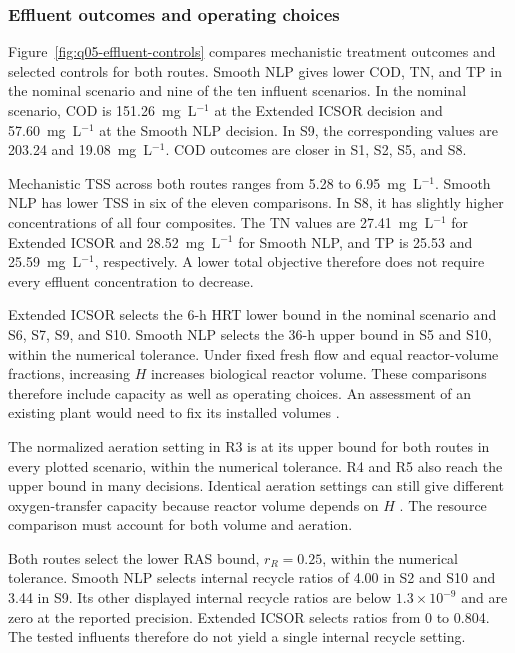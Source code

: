 \documentclass[a4paper,fleqn]{cas-sc}
\begin{document}
\subsubsection{Effluent outcomes and operating choices}
\label{sec:results-effluent-controls}

Figure~\ref{fig:q05-effluent-controls} compares mechanistic treatment outcomes and selected controls for both routes. Smooth NLP gives lower COD, TN, and TP in the nominal scenario and nine of the ten influent scenarios. In the nominal scenario, COD is 151.26~mg~L$^{-1}$ at the Extended ICSOR decision and 57.60~mg~L$^{-1}$ at the Smooth NLP decision. In S9, the corresponding values are 203.24 and 19.08~mg~L$^{-1}$. COD outcomes are closer in S1, S2, S5, and S8.

Mechanistic TSS across both routes ranges from 5.28 to 6.95~mg~L$^{-1}$. Smooth NLP has lower TSS in six of the eleven comparisons. In S8, it has slightly higher concentrations of all four composites. The TN values are 27.41~mg~L$^{-1}$ for Extended ICSOR and 28.52~mg~L$^{-1}$ for Smooth NLP, and TP is 25.53 and 25.59~mg~L$^{-1}$, respectively. A lower total objective therefore does not require every effluent concentration to decrease.

Extended ICSOR selects the 6-h HRT lower bound in the nominal scenario and S6, S7, S9, and S10. Smooth NLP selects the 36-h upper bound in S5 and S10, within the numerical tolerance. Under fixed fresh flow and equal reactor-volume fractions, increasing $H$ increases biological reactor volume. These comparisons therefore include capacity as well as operating choices. An assessment of an existing plant would need to fix its installed volumes \citep{Zhang2026}.

The normalized aeration setting in R3 is at its upper bound for both routes in every plotted scenario, within the numerical tolerance. R4 and R5 also reach the upper bound in many decisions. Identical aeration settings can still give different oxygen-transfer capacity because reactor volume depends on $H$ \citep{Miederer2025}. The resource comparison must account for both volume and aeration.

Both routes select the lower RAS bound, $r_R=0.25$, within the numerical tolerance. Smooth NLP selects internal recycle ratios of 4.00 in S2 and S10 and 3.44 in S9. Its other displayed internal recycle ratios are below $1.3\times10^{-9}$ and are zero at the reported precision. Extended ICSOR selects ratios from 0 to 0.804. The tested influents therefore do not yield a single internal recycle setting.
\end{document}
